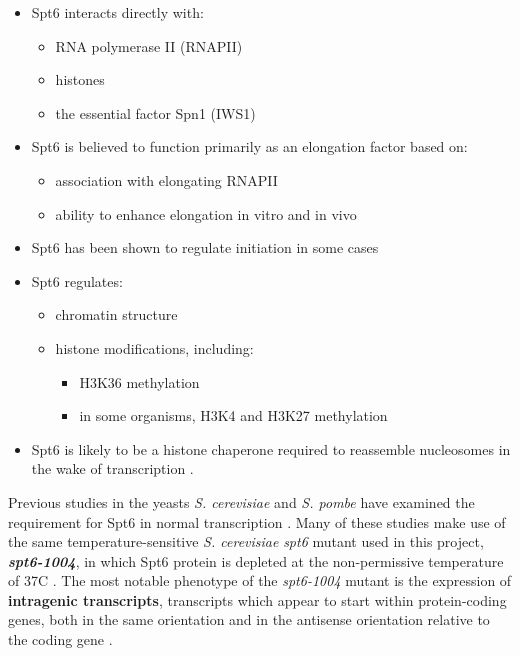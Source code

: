 \documentclass[9pt, letterpaper]{article}
\begin{document}
\begin{itemize}[nosep, topsep=.5em]
\item Spt6 interacts directly with:
	\begin{itemize}[nosep]
	\item RNA polymerase II (RNAPII) \cite{close2011, diebold2011, liu2011, sdano2017, sun2010, yoh2007}
	\item histones \cite{bortvin1996, mccullough2015}
	\item the essential factor Spn1 (IWS1) \cite{diebold2010b, li2018, mcdonald2010}
	\end{itemize}
\item Spt6 is believed to function primarily as an elongation factor based on:
	\begin{itemize}[nosep]
	\item association with elongating RNAPII \cite{andrulis2000, ivanovska2011, kaplan2000, mayer2010}
	\item ability to enhance elongation in vitro \cite{endoh2004} and in vivo \cite{ardehali2009}
	\end{itemize}
\item Spt6 has been shown to regulate initiation in some cases \cite{adkins2006, ivanovska2011}
\item Spt6 regulates:
	\begin{itemize}[nosep]
	\item chromatin structure \cite{bortvin1996, degennaro2013, ivanovska2011, jeronimo2015, kaplan2003, perales2013, vanbakel2013}
	\item histone modifications, including:
		\begin{itemize}[nosep]
		\item H3K36 methylation \cite{carrozza2005, chu2006, yoh2008, youdell2008}
		\item in some organisms, H3K4 and H3K27 methylation \cite{begum2012, chen2012, degennaro2013, wang2017, wang2013}
		\end{itemize}
	\end{itemize}
\item Spt6 is likely to be a histone chaperone required to reassemble nucleosomes in the wake of transcription \cite{duina2011}.
\end{itemize}

Previous studies in the yeasts \textit{S. cerevisiae} and \textit{S. pombe} have examined the requirement for Spt6 in normal transcription \cite{cheung2008, degennaro2013, kaplan2003, pathak2018, uwimana2017, vanbakel2013}. Many of these studies make use of the same temperature-sensitive \textit{S. cerevisiae} \textit{spt6} mutant used in this project, \textbf{\textit{spt6-1004}}, in which Spt6 protein is depleted at the non-permissive temperature of 37\textdegree C \cite{kaplan2003}. The most notable phenotype of the \textit{spt6-1004} mutant is the expression of \textbf{intragenic transcripts}, transcripts which appear to start within protein-coding genes, both in the same orientation and in the antisense orientation relative to the coding gene \cite{cheung2008, degennaro2013, kaplan2003, uwimana2017}.
\end{document}
